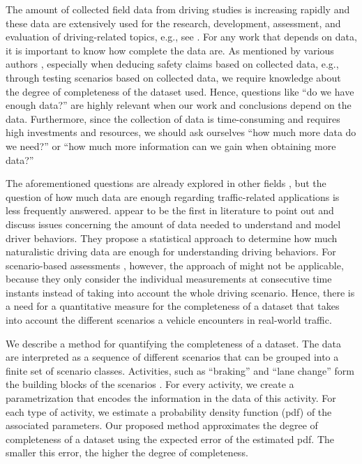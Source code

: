 The amount of collected field data from driving studies is increasing rapidly and these data are extensively used for the research, development, assessment, and evaluation of driving-related topics, e.g., see \textcite{dingus2016crashrisk, klauer2006impact, williamson2011link, sadigh2014data, broggi2013extensive, zofka2015datadrivetrafficscenarios, elrofai2018scenario, deGelder2017assessment, ploeg2018cetran, putz2017pegasus, krajewski2018highD}. For any work that depends on data, it is important to know how complete the data are. As mentioned by various authors \cite{geyer2014, stellet2015taxonomy, alvarez2017prospective}, especially when deducing safety claims based on collected data, e.g., through testing scenarios based on collected data, we require knowledge about the degree of completeness of the dataset used. Hence, questions like ``do we have enough data?'' are highly relevant when our work and conclusions depend on the data. Furthermore, since the collection of data is time-consuming and requires high investments and resources, we should ask ourselves ``how much more data do we need?'' or ``how much more information can we gain when obtaining more data?''

The aforementioned questions are already explored in other fields \cite{guest2006many, blair2004evolution, marks2018howmuch, yang2012estimating, wang2017much}, but the question of how much data are enough regarding traffic-related applications is less frequently answered. \textcite{wang2017much} appear to be the first in literature to point out and discuss issues concerning the amount of data needed to understand and model driver behaviors. They propose a statistical approach to determine how much naturalistic driving data are enough for understanding driving behaviors. 
For scenario-based assessments \cite{stellet2015taxonomy, alvarez2017prospective, elrofai2018scenario, ploeg2018cetran, geyer2014}, however, the approach of \textcite{wang2017much} might not be applicable, because they only consider the individual measurements at consecutive time instants instead of taking into account the whole driving scenario. Hence, there is a need for a quantitative measure for the completeness of a dataset that takes into account the different scenarios a vehicle encounters in real-world traffic.

We describe a method for quantifying the completeness of a dataset. The data are interpreted as a sequence of different scenarios that can be grouped into a finite set of scenario classes. Activities, such as ``braking'' and ``lane change'' form the building blocks of the scenarios \cite{elrofai2018scenario}. For every activity, we create a parametrization that encodes the information in the data of this activity. For each type of activity, we estimate a probability density function (pdf) of the associated parameters. Our proposed method approximates the degree of completeness of a dataset using the expected error of the estimated pdf. The smaller this error, the higher the degree of completeness.

